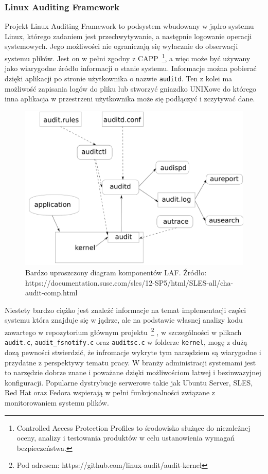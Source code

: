 \subsubsection{Linux Auditing Framework}
Projekt Linux Auditing Framework to podsystem wbudowany w jądro systemu Linux, którego zadaniem jest przechwytywanie,
a następnie logowanie operacji systemowych. Jego możliwości nie ograniczają się wyłacznie do 
obserwacji systemu plików. Jest on w pełni zgodny z CAPP~\footnote{Controlled Access Protection Profiles to środowisko służące do niezależnej oceny, analizy i testowania produktów w celu ustanowienia wymagań bezpieczeństwa.}, a
więc może być używany jako wiarygodne źródło informacji o stanie systemu. Informacje można pobierać dzięki aplikacji
po stronie użytkownika o nazwie \texttt{auditd}. Ten z kolei ma możliwość zapisania logów do pliku lub stworzyć gniazdko UNIXowe
do którego inna aplikacja w przestrzeni użytkownika może się podłączyć i zczytywać dane.
\begin{figure}[H]
    \centering
    \includegraphics[width=0.6\linewidth]{rysunki/audit.png}
    \caption{Bardzo uproszczony diagram komponentów LAF. \newline Źródło: https://documentation.suse.com/sles/12-SP5/html/SLES-all/cha-audit-comp.html}
    \label{fig:enter-label}
\end{figure}
Niestety bardzo ciężko jest znaleźć informacje na temat implementacji części systemu która znajduje się w jądrze, ale 
na podstawie własnej analizy kodu zawartego w repozytorium głównym projektu~\footnote{Pod adresem: https://github.com/linux-audit/audit-kernel}
, w szczególności w plikach \texttt{audit.c}, \texttt{audit\_fsnotify.c} oraz \texttt{auditsc.c} w folderze \texttt{kernel}, mogę z dużą
dozą pewności stwierdzić, że infromacje wykryte tym narzędziem są wiarygodne i przydatne z perspektywy tematu pracy.
W branży administracji systemami jest to narzędzie dobrze znane i poważane dzięki możliwościom łatwej i bezinwazyjnej konfiguracji.
Popularne dystrybucje serwerowe takie jak Ubuntu Server, SLES, Red Hat oraz Fedora wspierają w pełni funkcjonalności
związane z monitorowaniem systemu plików. 
